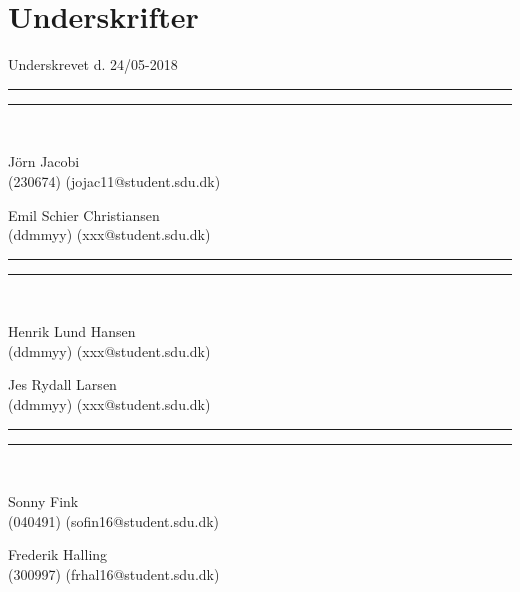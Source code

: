 
\section*{Underskrifter}
\vspace{3ex} \hfill Underskrevet d. 24/05-2018\\

\newlength{\streg} \setlength{\streg}{0.49\linewidth}
\vspace*{\fill} \rule{\streg}{1pt} \hfill \rule{\streg}{1pt}\\
\begin{minipage}[b]{\streg}
 \centering
 \rule{0pt}{4ex}
 J\"{o}rn Jacobi \\
 {\footnotesize (230674) (jojac11@student.sdu.dk)}
\end{minipage}
\hfill
\begin{minipage}[b]{\streg}
 \centering
 Emil Schier Christiansen \\
 {\footnotesize (ddmmyy) (xxx@student.sdu.dk)}
\end{minipage}

\vspace*{\fill} \rule{\streg}{1pt} \hfill \rule{\streg}{1pt}\\
\begin{minipage}[b]{\streg}
 \centering
 \rule{0pt}{4ex}
 Henrik Lund Hansen \\
 {\footnotesize (ddmmyy) (xxx@student.sdu.dk)}
\end{minipage}
\hfill
\begin{minipage}[b]{\streg}
 \centering
 Jes Rydall Larsen \\
 {\footnotesize (ddmmyy) (xxx@student.sdu.dk)}
\end{minipage}

\vspace*{\fill} \rule{\streg}{1pt} \hfill \rule{\streg}{1pt}\\
\begin{minipage}[b]{\streg}
	\centering
	\rule{0pt}{4ex}
	Sonny Fink \\
	{\footnotesize (040491) (sofin16@student.sdu.dk)}
\end{minipage}
\hfill
\begin{minipage}[b]{\streg}
	\centering
	Frederik Halling  \\
	{\footnotesize (300997) (frhal16@student.sdu.dk)}
\end{minipage}